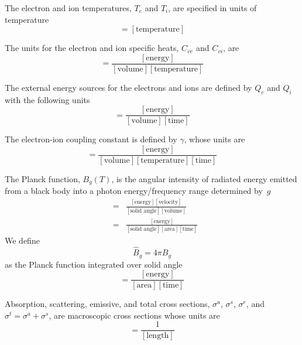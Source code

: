 \documentclass[12pt]{article}
\newcommand{\Bg}{\ensuremath{\hat{B}_{g}}}
\newcommand{\units}[1]{\ensuremath{[\mbox{#1}]}}
\begin{document}
The electron and ion temperatures, $T_{e}$ and $T_{i}$, are specified
in units of temperature
\begin{equation}
        [T] = \units{temperature}
\end{equation}

The units for the electron and ion specific heats, $C_{ve}$ and $C_{vi}$, are 
\begin{equation}
        [C_{v}] = \frac{\units{energy}}{\units{volume}\units{temperature}}
\end{equation}

The external energy sources for the electrons and ions are defined by
$Q_{e}$ and $Q_{i}$ with the following units
\begin{equation}
        [Q] = \frac{\units{energy}}{\units{volume}\units{time}}
\end{equation}

The electron-ion coupling constant is defined by $\gamma$, whose units are
\begin{equation}
        [\gamma] = \frac{\units{energy}}{\units{volume}\units{temperature}
                                         \units{time}}
\end{equation}

The Planck function, $B_{g}(T)$, is the angular intensity
of radiated energy emitted from a 
black body into a photon energy/frequency range determined by~$g$
\begin{eqnarray}
        [B_{g}] &=& \frac{\units{energy} \units{velocity}}
                         {\units{solid angle} \units{volume}} \\
                &=& \frac{\units{energy}}
                         {\units{solid angle} \units{area} \units{time}}
\end{eqnarray}
We define
\begin{equation}
   \Bg = 4\pi B_{g}
\end{equation}
 as the Planck function integrated over solid angle
\begin{equation}
        [\Bg] = \frac{\units{energy}}
                     {\units{area} \units{time}}
\end{equation}

Absorption, scattering, emissive, and total cross sections, $\sigma^{a}$,
$\sigma^{s}$, $\sigma^{e}$, and $\sigma^{t} = \sigma^{a} + \sigma^{s}$,
are macroscopic cross sections whose units are
\begin{equation}
        [\sigma] = \frac{1}{\units{length}}
\end{equation}
\end{document}
